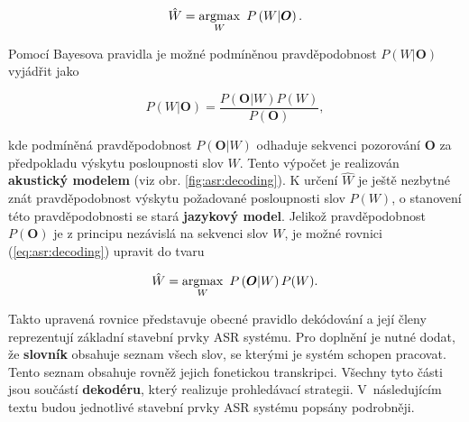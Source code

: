 \begin{equation}
  \hat{W} = \operatorname*{argmax}_W\ P\left(W | \boldsymbol{O}\right).
  \label{eq:asr:decoding}
\end{equation}

\newpage Pomocí Bayesova pravidla je možné podmíněnou pravděpodobnost $P\left(W | \boldsymbol{O}\right)$ vyjádřit jako

\begin{equation}
  P\left(W | \boldsymbol{O}\right) = \frac{P(\boldsymbol{O}|W)P(W)}{P(\boldsymbol{O})},
\end{equation}

\noindent kde podmíněná pravděpodobnost $P(\boldsymbol{O} | W)$ odhaduje sekvenci pozorování $\boldsymbol{O}$ za předpokladu výskytu posloupnosti slov $W$. Tento výpočet je realizován \textbf{akustický modelem} (viz obr. \ref{fig:asr:decoding}). K určení $\hat{W}$ je ještě nezbytné znát pravděpodobnost výskytu požadované posloupnosti slov $P\left(W\right)$, o stanovení této pravděpodobnosti se stará \textbf{jazykový model}. Jelikož pravděpodobnost $P(\boldsymbol{O})$ je z principu nezávislá na sekvenci slov $W$, je možné rovnici (\ref{eq:asr:decoding}) upravit do tvaru

\begin{equation}
  \hat{W} = \argmax_W\ P\left(\boldsymbol{O} | W\right)P(W).
  \label{eq:asr:decoding:generic}
\end{equation}

Takto upravená rovnice představuje obecné pravidlo dekódování a její členy reprezentují základní stavební prvky ASR systému. Pro doplnění je nutné dodat, že \textbf{slovník} obsahuje seznam všech slov, se kterými je systém schopen pracovat. Tento seznam obsahuje rovněž jejich fonetickou transkripci. Všechny tyto části jsou součástí \textbf{dekodéru}, který realizuje prohledávací strategii. V~následujícím textu budou jednotlivé stavební prvky ASR systému popsány podrobněji.





% 


